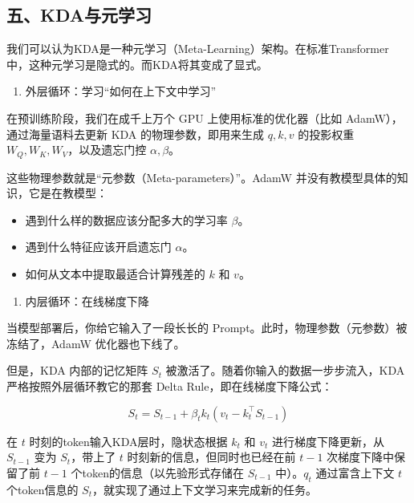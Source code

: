 \hypertarget{ux4e94kdaux4e0eux5143ux5b66ux4e60}{%
\subsection{五、KDA与元学习}\label{ux4e94kdaux4e0eux5143ux5b66ux4e60}}

我们可以认为KDA是一种元学习（Meta-Learning）架构。在标准Transformer中，这种元学习是隐式的。而KDA将其变成了显式。

\begin{enumerate}
\def\labelenumi{\arabic{enumi}.}
\tightlist
\item
  外层循环：学习``如何在上下文中学习''
\end{enumerate}

在预训练阶段，我们在成千上万个 GPU 上使用标准的优化器（比如 AdamW），通过海量语料去更新 KDA 的物理参数，即用来生成 \(q,k,v\) 的投影权重 \(W_Q,W_K,W_V\)，以及遗忘门控 \(\alpha,\beta\)。

这些物理参数就是``元参数（Meta-parameters）''。AdamW 并没有教模型具体的知识，它是在教模型：

\begin{itemize}
\tightlist
\item
  遇到什么样的数据应该分配多大的学习率 \(\beta\)。
\item
  遇到什么特征应该开启遗忘门 \(\alpha\)。
\item
  如何从文本中提取最适合计算残差的 \(k\) 和 \(v\)。
\end{itemize}

\begin{enumerate}
\def\labelenumi{\arabic{enumi}.}
\setcounter{enumi}{1}
\tightlist
\item
  内层循环：在线梯度下降
\end{enumerate}

当模型部署后，你给它输入了一段长长的 Prompt。此时，物理参数（元参数）被冻结了，AdamW 优化器也下线了。

但是，KDA 内部的记忆矩阵 \(S_t\) 被激活了。随着你输入的数据一步步流入，KDA 严格按照外层循环教它的那套 Delta Rule，即在线梯度下降公式：

\[
S_t=S_{t-1}+\beta_tk_t\left(v_t-k_t^\top S_{t-1}\right)
\]

在 \(t\) 时刻的token输入KDA层时，隐状态根据 \(k_t\) 和 \(v_t\) 进行梯度下降更新，从 \(S_{t-1}\) 变为 \(S_t\)，带上了 \(t\) 时刻新的信息，但同时也已经在前 \(t-1\) 次梯度下降中保留了前 \(t-1\) 个token的信息（以先验形式存储在 \(S_{t-1}\) 中）。\(q_t\) 通过富含上下文 \(t\) 个token信息的 \(S_t\)，就实现了通过上下文学习来完成新的任务。

